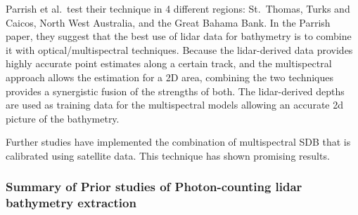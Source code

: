 Parrish et al.~test their technique in 4 different regions: St.~Thomas,
Turks and Caicos, North West Australia, and the Great Bahama Bank. In
the Parrish paper, they suggest that the best use of lidar data for
bathymetry is to combine it with optical/multispectral techniques.
Because the lidar-derived data provides highly accurate point estimates
along a certain track, and the multispectral approach allows the
estimation for a 2D area, combining the two techniques provides a
synergistic fusion of the strengths of both. The lidar-derived depths
are used as training data for the multispectral models allowing an
accurate 2d picture of the bathymetry.

Further studies have implemented the combination of multispectral SDB
that is calibrated using satellite data. This technique has shown
promising results.

\hypertarget{summary-of-prior-studies-of-photon-counting-lidar-bathymetry-extraction}{%
  \subsubsection{Summary of Prior studies of Photon-counting lidar
    bathymetry
    extraction}\label{summary-of-prior-studies-of-photon-counting-lidar-bathymetry-extraction}}


